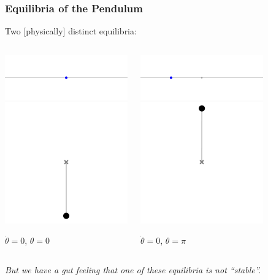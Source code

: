 \documentclass[12pt]{beamer}
\begin{document}
\begin{frame}
\frametitle{Equilibria of the Pendulum}

Two [physically] distinct equilibria:

\begin{columns}


\begin{center}
\includegraphics[width=.4\linewidth]{pic/Pendulum_0deg.png}

$\dot\theta = 0$, $\theta=0$

\end{center}



\begin{center}
\includegraphics[width=.4\linewidth]{pic/Pendulum_180deg.png}

$\dot\theta = 0$, $\theta=\pi$
\end{center}


\end{columns}

\vfill
\emph{But we have a gut feeling that one of these equilibria is not ``stable''.}

\end{frame}
\end{document}
